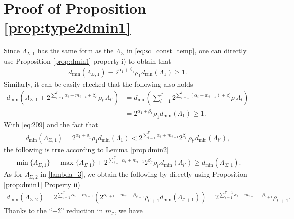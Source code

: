 \documentclass[12pt, draftclsnofoot, onecolumn]{IEEEtran}
\theoremstyle{definition}
\begin{document}
\section{Proof of Proposition \ref{prop:type2dmin1}}\label{appD}

Since $\Lambda_{\Sigma,1}$ has the same form as the $\Lambda_{\Sigma}$ in \eqref{eq:sc_const_temp}, one can directly use Proposition \ref{prop:dmin1} property i) to obtain that
\begin{align}
d_{\min}(\Lambda_{\Sigma,1})=2^{\alpha_1+\beta_1}\rho_1d_{\min}(\Lambda_1)  \geq 1.
\end{align}
Similarly, it can be easily checked that the following also holds
\begin{align}\label{eq:209}
d_{\min}\left(\Lambda_{\Sigma,1} +2^{\sum_{i=1}^{l'}\alpha_i+m_{i-1}+\beta_{l'}}\rho_{l'}\Lambda_{l'}\right) &=  d_{\min}\left(\sum_{l=1}^{l'} 2^{\sum_{i=1}^l(\alpha_i+m_{i-1})+\beta_l}\rho_l\Lambda_l \right) \nonumber \\
& =2^{\alpha_1+\beta_1}\rho_1d_{\min}(\Lambda_1)  \geq 1 .
\end{align}
With \eqref{eq:209} and the fact that
\begin{align}\label{eq:210a}
d_{\min}(\Lambda_{\Sigma,1})=2^{\alpha_1+\beta_1}\rho_1d_{\min}(\Lambda_1) < 2^{\sum_{i=1}^{l'}\alpha_i+m_{i-1}}2^{\beta_{l'}}\rho_{l'}d_{\min}(\Lambda_{l'}),
\end{align}
the following is true according to Lemma \ref{prop:dmin2}
\begin{align}\label{eq:210}
\min\{\Lambda_{\Sigma,1}\}-\max\{\Lambda_{\Sigma,1}\}+2^{\sum_{i=1}^{l'}\alpha_i+m_{i-1}}2^{\beta_{l'}}\rho_{l'}d_{\min}(\Lambda_{l'}) \geq d_{\min}(\Lambda_{\Sigma,1}).
\end{align}
As for $\Lambda_{\Sigma,2}$ in \eqref{lambda_3}, we obtain the following by directly using Proposition \ref{prop:dmin1} Property ii)
\begin{align}\label{eq:lambda_sigma3}
d_{\min}(\Lambda_{\Sigma,2}) = 2^{\sum_{i=1}^{l'}\alpha_i+m_{i-1}}\left( 2^{\alpha_{l'+1}+m_{l'}+\beta_{l'+1}}\rho_{l'+1}d_{\min}(\Lambda_{l'+1})\right)= 2^{\sum_{i=1}^{l'+1}\alpha_i+m_{i-1}+\beta_{l'+1}}\rho_{l'+1}.
\end{align}
Thanks to the ``$-2$'' reduction in $m_{l'}$, we have
\end{document}
